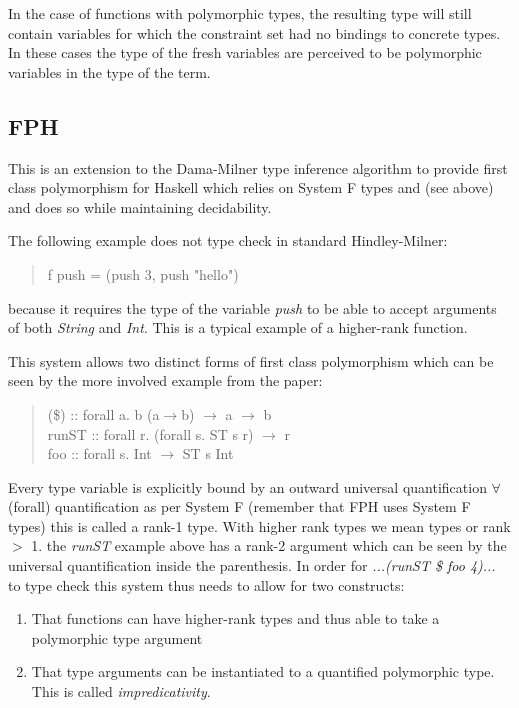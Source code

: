 \documentclass[12pt, a4paper, oneside]{article}
\begin{document}
In the case of functions with polymorphic types, the resulting type will still contain variables for which the constraint set had no bindings to concrete types. In these cases the type of the fresh variables are perceived to be polymorphic variables in the type of the term.
\subsection{FPH\cite{FPH}}

This is an extension to the Dama-Milner type inference algorithm to provide first class polymorphism for Haskell which relies on System F types and (see above) and does so while maintaining decidability. 

The following example does not type check in standard Hindley-Milner:
\begin{quotation}
f push = (push 3, push "hello")
\end{quotation}

because it requires the type of the variable \textit{push} to be able to accept arguments of both \textit{String} and \textit{Int}. This is a typical example of a higher-rank function. 

This system allows two distinct forms of first class polymorphism which can be seen by the more involved example from the paper\cite{FPH}:

\begin{quotation}
(\$) \hspace{13pt} :: forall a. b (a$\rightarrow$b) $\rightarrow$ a $\rightarrow$ b\\
\indent runST :: forall r. (forall s. ST s r) $\rightarrow$ r\\
\indent foo \hspace{13pt} :: forall s. Int $\rightarrow$ ST s Int
\end{quotation}

Every type variable is explicitly bound by an outward universal quantification $\forall$ (forall) quantification as per System F (remember that FPH uses System F types) this is called a rank-1 type. With higher rank types we mean types or rank $>$ 1.
the \textit{runST} example above has a rank-2 argument which can be seen by the universal quantification inside the parenthesis.
In order for \textit{...(runST \$ foo 4)...} to type check this system thus needs to allow for two constructs:
\begin{enumerate}
\item That functions can have higher-rank types and thus able to take a polymorphic type argument
\item That type arguments can be instantiated to a quantified polymorphic type. This is called \textit{impredicativity}.
\end{enumerate}
\end{document}
